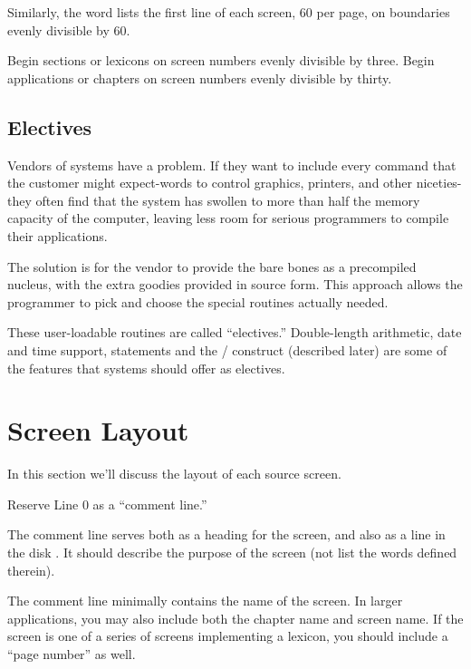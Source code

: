Similarly, the word  lists the first line of each screen, 60 per
page, on boundaries evenly divisible by 60.

\begin{tip}
Begin sections or lexicons on screen numbers evenly divisible by three.
Begin applications or chapters on screen numbers evenly divisible by
thirty.
\end{tip}

\subsection{Electives}
Vendors of \Forth{} systems have a problem.  If they want to include
every command that the customer might expect-words to control
graphics, printers, and other niceties-they often find that the system
has swollen to more than half the memory capacity of the computer, leaving
less room for serious programmers to compile their applications.

The solution is for the vendor to provide the bare bones as a precompiled
nucleus, with the extra goodies provided in source form.  This approach
allows the programmer to pick and choose the special routines
actually needed.

These user-loadable routines are called ``electives.'' Double-length
arithmetic, date and time support,  statements and the
/\hy {} construct (described later) are some of
the features that \Forth{} systems should offer as electives.

\section{Screen Layout}

In this section we'll discuss the layout of each source screen.

\begin{tip}
Reserve Line 0 as a ``comment line.''
\end{tip}
The comment line serves both as a heading for the screen, and also as a
line in the disk .  It should describe the purpose of the screen (not
list the words defined therein).

The comment line minimally contains the name of the screen.  In
larger applications, you may also include both the chapter name and
screen name.  If the screen is one of a series of screens implementing a
lexicon, you should include a ``page number'' as well.

